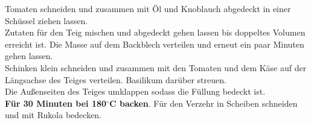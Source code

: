 \vspace*{\fill}
\begin{multicols}{2}


Tomaten schneiden und zusammen mit Öl und Knoblauch abgedeckt in einer Schüssel ziehen lassen.\\

Zutaten für den Teig mischen und abgedeckt gehen lassen bis doppeltes Volumen erreicht ist. 
Die Masse auf dem Backblech verteilen und erneut ein paar Minuten gehen lassen.\\

Schinken klein schneiden und zusammen mit den Tomaten und dem Käse auf der Längsachse des Teiges verteilen. 
Basilikum darüber streuen.\\ 

Die Außenseiten des Teiges umklappen sodass die Füllung bedeckt ist.\\ \textbf{Für 30 Minuten bei 180$^\circ$C backen}. 
Für den Verzehr in Scheiben schneiden und mit Rukola bedecken.



\end{multicols}
\vfill
